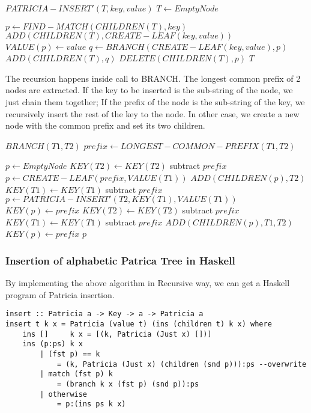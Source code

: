 \documentclass{article}
\begin{document}
\begin{algorithmic}
\STATE $PATRICIA-INSERT'(T, key, value)$
   \STATE $T \leftarrow EmptyNode$ \ENDIF

\STATE $p \leftarrow FIND-MATCH(CHILDREN(T), key)$
  \STATE $ADD(CHILDREN(T), CREATE-LEAF(key, value))$
  \STATE $VALUE(p) \leftarrow value$
\ELSE
  \STATE $q \leftarrow BRANCH(CREATE-LEAF(key, value), p)$
  \STATE $ADD(CHILDREN(T), q)$
  \STATE $DELETE(CHILDREN(T), p)$
\ENDIF
\RETURN $T$
\end{algorithmic}

The recursion happens inside call to BRANCH. The longest common prefix
of 2 nodes are extracted. If the key to be inserted is the sub-string of
the node, we just chain them together; If the prefix of the node is
the sub-string of the key, we recursively insert the rest of the key
to the node. In other case, we create a new node with the common
prefix and set its two children.

\begin{algorithmic}
\STATE $BRANCH(T1, T2)$
  \STATE $prefix \leftarrow LONGEST-COMMON-PREFIX(T1, T2)$

  \STATE $p \leftarrow EmptyNode$
    \STATE $KEY(T2) \leftarrow KEY(T2)$ subtract $prefix$
    \STATE $p \leftarrow CREATE-LEAF(prefix, VALUE(T1))$
    \STATE $ADD(CHILDREN(p), T2)$
    \STATE $KEY(T1) \leftarrow KEY(T1)$ subtract $prefix$
    \STATE $p \leftarrow PATRICIA-INSERT'(T2, KEY(T1), VALUE(T1))$
    \STATE $KEY(p) \leftarrow prefix$
  \ELSE
    \STATE $KEY(T2) \leftarrow KEY(T2)$ subtract $prefix$
    \STATE $KEY(T1) \leftarrow KEY(T1)$ subtract $prefix$
    \STATE $ADD(CHILDREN(p), T1, T2)$
    \STATE $KEY(p) \leftarrow prefix$
  \ENDIF
  \RETURN $p$
\end{algorithmic}

\subsubsection*{Insertion of alphabetic Patrica Tree in Haskell}
By implementing the above algorithm in Recursive way, we can get a 
Haskell program of Patricia insertion.

\lstset{language=Haskell}
\begin{lstlisting}
insert :: Patricia a -> Key -> a -> Patricia a
insert t k x = Patricia (value t) (ins (children t) k x) where
    ins []     k x = [(k, Patricia (Just x) [])]
    ins (p:ps) k x 
        | (fst p) == k 
            = (k, Patricia (Just x) (children (snd p))):ps --overwrite
        | match (fst p) k 
            = (branch k x (fst p) (snd p)):ps
        | otherwise 
            = p:(ins ps k x)

\end{lstlisting}
\end{document}

